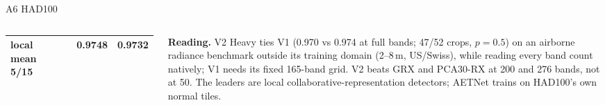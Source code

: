 \documentclass[aspectratio=169,10pt]{beamer}
\newcommand{\tx}[1]{{\fontsize{6.6}{7.9}\selectfont #1\par}}
\begin{document}
\begin{frame}{A6 HAD100}
\begin{columns}[T,onlytextwidth]
{\begin{tabular}{@{}lrrrrr@{}}
\quad local mean 5/15 & & & & 0.9748 & 0.9732\\
\bottomrule
\end{tabular}}\par
{}
\vspace{0.6mm}
\tx{\textbf{Reading.} V2 Heavy ties V1 (0.970 vs 0.974 at full bands; 47/52 crops, $p=0.5$) on an airborne radiance benchmark outside its training domain (2--8\,m, US/Swiss), while reading every band count natively; V1 needs its fixed 165-band grid. V2 beats GRX and PCA30-RX at 200 and 276 bands, not at 50. The leaders are local collaborative-representation detectors; AETNet trains on HAD100's own normal tiles.}
\end{columns}
\end{frame}
\end{document}
